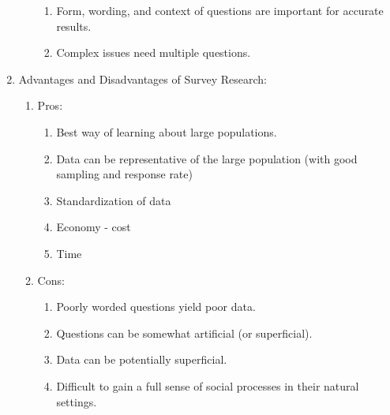 \documentclass[12pt,a4paper]{article}
\begin{document}
\begin{enumerate}
\begin{enumerate}
\begin{enumerate}
			\item Form, wording, and context of questions are important for accurate results.
			\item Complex issues need multiple questions. 
		\end{enumerate}
	\end{enumerate}
	\item Advantages and Disadvantages of Survey Research: 
	\begin{enumerate}
		\item Pros: 
		\begin{enumerate}
			\item Best way of learning about large populations.
			\item Data can be representative of the large population (with good sampling and response rate)
			\item Standardization of data
			\item Economy - cost
			\item Time
		\end{enumerate}
		\item Cons: 
		\begin{enumerate}
			\item Poorly worded questions yield poor data.
			\item Questions can be somewhat artificial (or superficial).
			\item Data can be potentially superficial.
			\item Difficult to gain a full sense of social processes in their natural settings. 
		\end{enumerate}
	\end{enumerate}
\end{enumerate}
\end{document}
